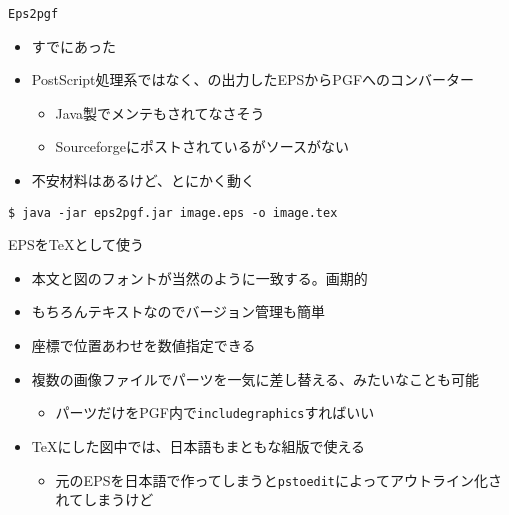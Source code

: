 \documentclass[14pt,dvipdfmx,uplatex]{beamer}
\begin{document}
\begin{frame}[t,fragile=singleslide]{\inhibitglue \texttt{Eps2pgf}}
  \sffamily
  \begin{itemize}
    \item すでにあった
    \item PostScript処理系ではなく、の出力したEPSからPGFへのコンバーター
    \begin{itemize}
      \item Java製でメンテもされてなさそう
      \item Sourceforgeにポストされているがソースがない
    \end{itemize}
    \item 不安材料はあるけど、とにかく動く
  \end{itemize}
  \fontsize{7pt}{7pt}\selectfont
  \begin{tcolorbox}
  \begin{Verbatim}[commandchars=\\\{\}]
$ java -jar eps2pgf.jar image.eps -o image.tex
  \end{Verbatim}
  \end{tcolorbox}
  \begin{center}
  \resizebox{100mm}{!}{}
  \end{center}

\end{frame}

\begin{frame}[t,fragile=singleslide]{\inhibitglue EPSを\TeX{}として使う}
  \sffamily
  \begin{itemize}
      \item 本文と図のフォントが当然のように一致する。画期的
      \item もちろんテキストなのでバージョン管理も簡単
      \item 座標で位置あわせを数値指定できる
      \item 複数の画像ファイルでパーツを一気に差し替える、みたいなことも可能
      \begin{itemize}\item パーツだけをPGF内で\texttt{\bslash{}includegraphics}すればいい\end{itemize}
      \item \TeX{}にした図中では、日本語もまともな組版で使える
      \begin{itemize}\item 元のEPSを日本語で作ってしまうと\texttt{pstoedit}によってアウトライン化されてしまうけど\end{itemize}
  \end{itemize}
\end{frame}
\end{document}
